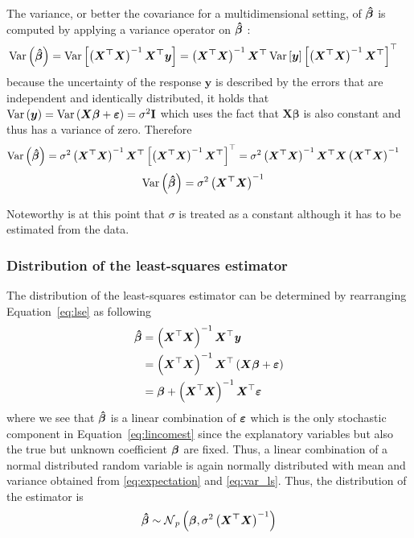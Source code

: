 \documentclass[11pt,a4paper,twoside]{book}\usepackage[]{graphicx}\usepackage[]{xcolor}
\begin{document}
The variance, or better the covariance for a multidimensional setting, of ${\boldsymbol{\hat\beta}}$ is computed by applying a variance operator on ${\boldsymbol{\hat\beta}}$ :
\begin{align*}
\operatorname{Var}\left({\boldsymbol{\hat\beta}}\right)&=\operatorname{Var}\left[\left(\boldsymbol{X^\top X}\right)^{-1}\boldsymbol{X^\top y}\right]=\left(\boldsymbol{X^\top X}\right)^{-1}\boldsymbol{X^\top} \operatorname{Var}\left[\boldsymbol{y}\right]\left[\left(\boldsymbol{X^\top X}\right)^{-1}\boldsymbol{X^\top}\right]^\top
\end{align*}
because the uncertainty of the response $\boldsymbol{y}$ is described by the errors that are independent and identically distributed, it holds that $\operatorname{Var}\left(\boldsymbol{y}\right)=\operatorname{Var}\left(\boldsymbol{X\beta}+\boldsymbol{\varepsilon}\right)=\sigma^2{\mathbf{I}}$ which uses the fact that $\boldsymbol{X\beta}$ is also constant and thus has a variance of zero. Therefore
\begin{align*}
\operatorname{Var}\left({\boldsymbol{\hat\beta}}\right)&=\sigma^2\left(\boldsymbol{X^\top X}\right)^{-1}\boldsymbol{X^\top}\left[\left(\boldsymbol{X^\top X}\right)^{-1}\boldsymbol{X^\top}\right]^\top=\sigma^2\left(\boldsymbol{X^\top X}\right)^{-1}\boldsymbol{X^\top X}\left(\boldsymbol{X^\top X}\right)^{-1}
\end{align*}
\begin{align}
\operatorname{Var}\left({\boldsymbol{\hat\beta}}\right)&=\sigma^2\left(\boldsymbol{X^\top X}\right)^{-1}\label{eq:var_ls}
\end{align}

Noteworthy is at this point that $\sigma$ is treated as a constant although it has to be estimated from the data. 

\subsubsection{Distribution of the least-squares estimator}
The distribution of the least-squares estimator can be determined by rearranging Equation~\eqref{eq:lse} as following
\begin{align}
{\boldsymbol{\hat\beta}}&=\left({\boldsymbol{X}}^\top {\boldsymbol{X}}\right)^{-1}{\boldsymbol{X}}^\top {\textbf{\textit{y}}} \nonumber\\
&=\left({\boldsymbol{X}}^\top {\boldsymbol{X}}\right)^{-1}{\boldsymbol{X}}^\top \left({\boldsymbol{X}}{\boldsymbol{\beta}}+{\boldsymbol{\varepsilon}}\right)\nonumber\\
&={\boldsymbol{\beta}} + \left({\boldsymbol{X}}^\top {\boldsymbol{X}}\right)^{-1}{\boldsymbol{X}}^\top {\boldsymbol{\varepsilon}} \label{eq:lincomest}
\end{align}
where we see that ${\boldsymbol{\hat\beta}}$ is a linear combination of ${\boldsymbol{\varepsilon}}$ which is the only stochastic component in Equation~\eqref{eq:lincomest} since the explanatory variables but also the true but unknown coefficient ${\boldsymbol{\beta}}$ are fixed. Thus, a linear combination of a normal distributed random variable is again normally distributed with mean and variance obtained from \eqref{eq:expectation} and \eqref{eq:var_ls}. Thus, the distribution of the estimator is
\begin{align}
{\boldsymbol{\hat\beta}}\sim \operatorname{\mathcal{N}}_p\left({\boldsymbol{\beta}},\sigma^2\left(\boldsymbol{X^\top X}\right)^{-1}\right)  \label{eq:distlse}
\end{align}
\end{document}
